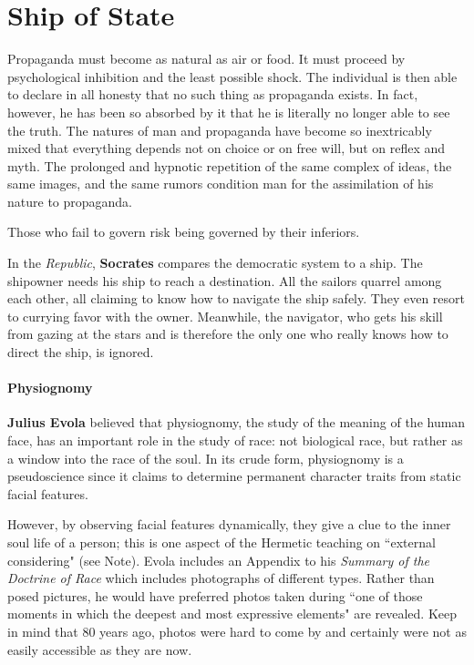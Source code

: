 \section{Ship of State}

\begin{quotex}
Propaganda must become as natural as air or food. It must proceed by psychological inhibition and the least possible shock. The individual is then able to declare in all honesty that no such thing as propaganda exists. In fact, however, he has been so absorbed by it that he is literally no longer able to see the truth. The natures of man and propaganda have become so inextricably mixed that everything depends not on choice or on free will, but on reflex and myth. The prolonged and hypnotic repetition of the same complex of ideas, the same images, and the same rumors condition man for the assimilation of his nature to propaganda. 

Those who fail to govern risk being governed by their inferiors. 

\end{quotex}
In the \emph{Republic}, \textbf{Socrates} compares the democratic system to a ship. The shipowner needs his ship to reach a destination. All the sailors quarrel among each other, all claiming to know how to navigate the ship safely. They even resort to currying favor with the owner. Meanwhile, the navigator, who gets his skill from gazing at the stars and is therefore the only one who really knows how to direct the ship, is ignored.

\paragraph{Physiognomy}
\textbf{Julius Evola} believed that physiognomy, the study of the meaning of the human face, has an important role in the study of race: not biological race, but rather as a window into the race of the soul. In its crude form, physiognomy is a pseudoscience since it claims to determine permanent character traits from static facial features.

However, by observing facial features dynamically, they give a clue to the inner soul life of a person; this is one aspect of the Hermetic teaching on ``external considering" (see Note). Evola includes an Appendix to his \emph{Summary of the Doctrine of Race} which includes photographs of different types. Rather than posed pictures, he would have preferred photos taken during ``one of those moments in which the deepest and most expressive elements" are revealed. Keep in mind that 80 years ago, photos were hard to come by and certainly were not as easily accessible as they are now.

